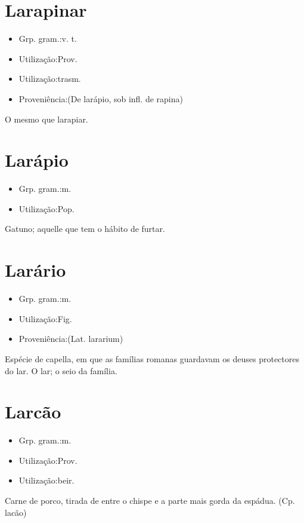 \section{Larapinar}
\begin{itemize}
\item {Grp. gram.:v. t.}
\end{itemize}
\begin{itemize}
\item {Utilização:Prov.}
\end{itemize}
\begin{itemize}
\item {Utilização:trasm.}
\end{itemize}
\begin{itemize}
\item {Proveniência:(De \textunderscore larápio\textunderscore , sob infl. de \textunderscore rapina\textunderscore )}
\end{itemize}
O mesmo que \textunderscore larapiar\textunderscore .
\section{Larápio}
\begin{itemize}
\item {Grp. gram.:m.}
\end{itemize}
\begin{itemize}
\item {Utilização:Pop.}
\end{itemize}
Gatuno; aquelle que tem o hábito de furtar.
\section{Larário}
\begin{itemize}
\item {Grp. gram.:m.}
\end{itemize}
\begin{itemize}
\item {Utilização:Fig.}
\end{itemize}
\begin{itemize}
\item {Proveniência:(Lat. \textunderscore lararium\textunderscore )}
\end{itemize}
Espécie de capella, em que as famílias romanas guardavam os deuses protectores do lar.
O lar; o seio da família.
\section{Larcão}
\begin{itemize}
\item {Grp. gram.:m.}
\end{itemize}
\begin{itemize}
\item {Utilização:Prov.}
\end{itemize}
\begin{itemize}
\item {Utilização:beir.}
\end{itemize}
Carne de porco, tirada de entre o chispe e a parte mais gorda da espádua.
(Cp. \textunderscore lacão\textunderscore )
